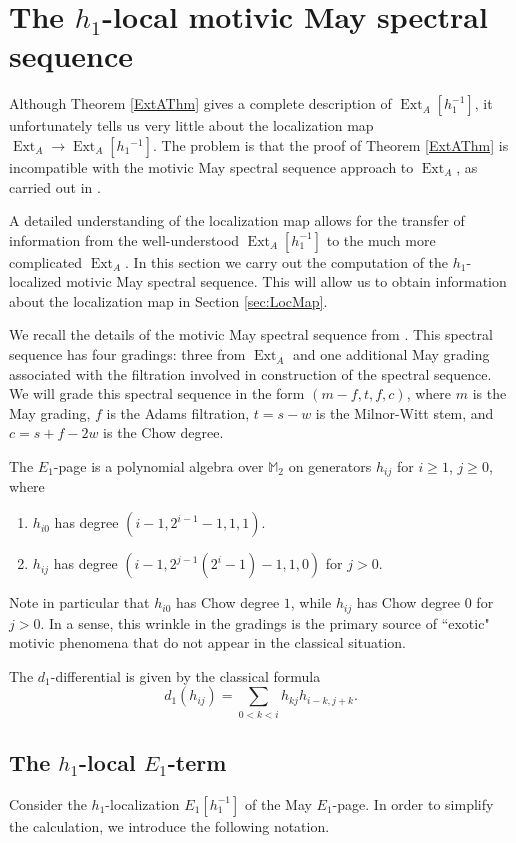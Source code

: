\documentclass[10pt]{amsart}
\begin{document}
\section{The $h_1$-local motivic May spectral sequence}\label{sec:MaySS}

Although Theorem \ref{ExtAThm} gives a complete description of $\operatorname{Ext}_A[h_1^{-1}]$,
it unfortunately tells us very little about the localization map
$\operatorname{Ext}_A \rightarrow \operatorname{Ext}_A[h_1{^{-1}}]$.  The problem is that the proof 
of Theorem \ref{ExtAThm} is incompatible with the motivic May spectral 
sequence approach to $\operatorname{Ext}_A$, as carried out in \cite{Istems}.

A detailed understanding of the localization map allows for the transfer
of information from the well-understood $\operatorname{Ext}_A[h_1^{-1}]$ to the
much more complicated $\operatorname{Ext}_A$.
In this section we carry out the computation of the
$h_1$-localized motivic May spectral sequence.
This will allow us to obtain information about the localization map in 
Section \ref{sec:LocMap}.

We recall the details of the motivic May spectral sequence from \cite{DI}. This
spectral sequence has four gradings: three from $\operatorname{Ext}_A$ and one additional
May grading associated with the filtration involved in construction of the
spectral sequence.  We will grade this spectral sequence in the form
$(m-f, t, f, c)$, where $m$ is the May grading, $f$ is the Adams filtration,
$t = s-w$ is the Milnor-Witt stem, and $c = s+f-2w$ is the Chow degree.
 
The $E_1$-page is a polynomial algebra over ${\ensuremath{\mathbb{M}}}_2$ on generators 
$h_{ij}$ for $i\geq 1$, $j\geq 0$, where
\begin{enumerate}
\item $h_{i0}$ has degree $(i-1, 2^{i-1}-1, 1, 1)$.
\item $h_{ij}$ has degree $(i-1, 2^{j-1}(2^i-1) - 1, 1, 0)$ for $j>0$.
\end{enumerate}
Note in particular that $h_{i0}$ has Chow degree $1$,
while $h_{ij}$ has Chow degree $0$ for $j > 0$.
In a sense, this wrinkle in the gradings is the primary source of 
``exotic" motivic phenomena that do not appear in the classical situation.

The $d_1$-differential is given by the classical formula
\[ d_1(h_{ij}) = \sum_{0<k<i} h_{kj}h_{i-k,j+k}.\]

\subsection{The $h_1$-local $E_1$-term}\label{sec:AMayE1}
Consider the $h_1$-localization $E_1[h_1^{-1}]$ of the May $E_1$-page.  
In order to simplify the calculation, we introduce the following notation.
\end{document}
